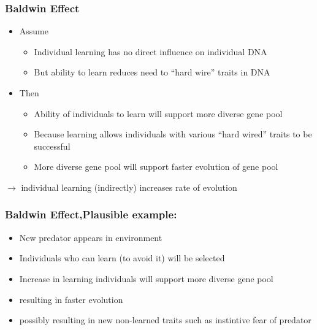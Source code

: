 \documentclass{beamer}
\begin{document}
\begin{frame}
\frametitle{Baldwin Effect}
\label{sec-6-10}


\begin{itemize}
\item Assume
\begin{itemize}
\item Individual learning has no direct influence on individual DNA
\item But ability to learn reduces need to ``hard wire'' traits in DNA
\end{itemize}
\item Then
\begin{itemize}
\item Ability of individuals to learn will support more diverse gene pool
\item Because learning allows individuals with various ``hard wired'' traits to be successful
\item More diverse gene pool will support faster evolution of gene pool
\end{itemize}
\end{itemize}

$\rightarrow$ individual learning (indirectly) increases rate of evolution
\end{frame}
\begin{frame}
\frametitle{Baldwin Effect,Plausible example:}
\label{sec-6-11}


\begin{itemize}
\item New predator appears in environment
\item Individuals who can learn (to avoid it) will be selected
\item Increase in learning individuals will support more diverse gene pool
\item resulting in faster evolution
\item possibly resulting in new non-learned traits such as instintive fear of predator
\end{itemize}
\end{frame}
\end{document}
